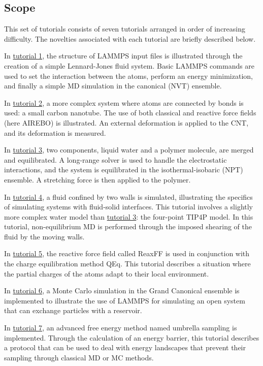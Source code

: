 \documentclass[9pt,tutorial]{livecoms}
\begin{document}
\subsection{Scope}

This set of tutorials consists of seven tutorials arranged in order of increasing difficulty. The novelties associated with each tutorial are briefly described below.

In \hyperref[lennard-jones-label]{tutorial 1}, the structure of LAMMPS input files is illustrated through the creation of a simple Lennard-Jones fluid system. Basic LAMMPS commands are used to set the interaction between the atoms, perform an energy minimization, and finally a simple MD simulation in the canonical (NVT) ensemble.

In \hyperref[carbon-nanotube-label]{tutorial 2}, a more complex system where atoms are connected by bonds is used: a small carbon nanotube. The use of both classical and reactive force fields (here AIREBO) is illustrated. An external deformation is applied to the CNT, and its deformation is measured.

In \hyperref[all-atoms-label]{tutorial 3}, two components, liquid water and a polymer molecule, are merged and equilibrated. A long-range solver is used to handle the electrostatic interactions, and the system is equilibrated in the isothermal-isobaric (NPT) ensemble. A stretching force is then applied to the polymer.

In \hyperref[sheared-confined-label]{tutorial 4}, a fluid confined by two walls is simulated, illustrating the specifics of simulating systems with fluid-solid interfaces. This tutorial involves a slightly more complex water model than \hyperref[all-atoms-label]{tutorial 3}: the four-point TIP4P model. In this tutorial, non-equilibrium MD is performed through the imposed shearing of the fluid by the moving walls.

In \hyperref[reactive-silicon-dioxide-label]{tutorial 5}, the reactive force field called ReaxFF is used in conjunction with the charge equilibration method QEq. This tutorial describes a situation where the partial charges of the atoms adapt to their local environment.

In \hyperref[gcmc-silica-label]{tutorial 6}, a Monte Carlo simulation in the Grand Canonical ensemble is implemented to illustrate the use of LAMMPS for simulating an open system that can exchange particles with a reservoir.

In \hyperref[umbrella-sampling-label]{tutorial 7}, an advanced free energy method named umbrella sampling is implemented. Through the calculation of an energy barrier, this tutorial describes a protocol that can be used to deal with energy landscapes that prevent their sampling through classical MD or MC methods.
\end{document}
